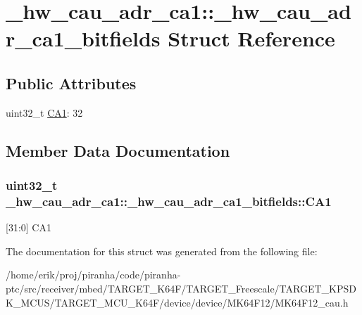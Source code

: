 \hypertarget{struct__hw__cau__adr__ca1_1_1__hw__cau__adr__ca1__bitfields}{}\section{\+\_\+hw\+\_\+cau\+\_\+adr\+\_\+ca1\+:\+:\+\_\+hw\+\_\+cau\+\_\+adr\+\_\+ca1\+\_\+bitfields Struct Reference}
\label{struct__hw__cau__adr__ca1_1_1__hw__cau__adr__ca1__bitfields}
\subsection*{Public Attributes}
\begin{DoxyCompactItemize}
\item 
uint32\+\_\+t \hyperlink{struct__hw__cau__adr__ca1_1_1__hw__cau__adr__ca1__bitfields_a2f9e9534e5330f5b5f8b55b5228fde8c}{C\+A1}\+: 32
\end{DoxyCompactItemize}


\subsection{Member Data Documentation}
\subsubsection[{\texorpdfstring{C\+A1}{CA1}}]{\setlength{\rightskip}{0pt plus 5cm}uint32\+\_\+t \+\_\+hw\+\_\+cau\+\_\+adr\+\_\+ca1\+::\+\_\+hw\+\_\+cau\+\_\+adr\+\_\+ca1\+\_\+bitfields\+::\+C\+A1}\hypertarget{struct__hw__cau__adr__ca1_1_1__hw__cau__adr__ca1__bitfields_a2f9e9534e5330f5b5f8b55b5228fde8c}{}\label{struct__hw__cau__adr__ca1_1_1__hw__cau__adr__ca1__bitfields_a2f9e9534e5330f5b5f8b55b5228fde8c}
\mbox{[}31\+:0\mbox{]} C\+A1 

The documentation for this struct was generated from the following file\+:\begin{DoxyCompactItemize}
\item 
/home/erik/proj/piranha/code/piranha-\/ptc/src/receiver/mbed/\+T\+A\+R\+G\+E\+T\+\_\+\+K64\+F/\+T\+A\+R\+G\+E\+T\+\_\+\+Freescale/\+T\+A\+R\+G\+E\+T\+\_\+\+K\+P\+S\+D\+K\+\_\+\+M\+C\+U\+S/\+T\+A\+R\+G\+E\+T\+\_\+\+M\+C\+U\+\_\+\+K64\+F/device/device/\+M\+K64\+F12/M\+K64\+F12\+\_\+cau.\+h\end{DoxyCompactItemize}
